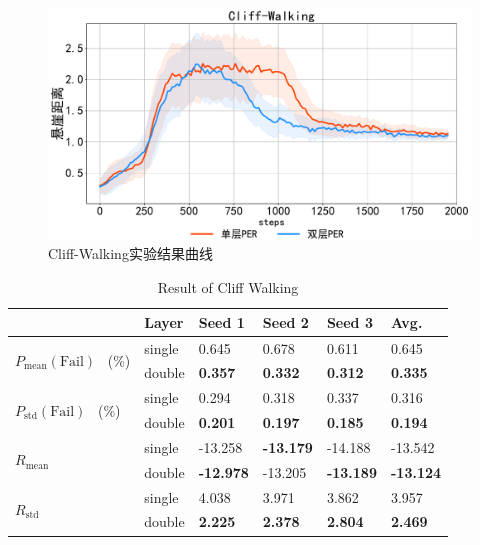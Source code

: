 \begin{figure}[t]
\centering
\includegraphics[width=\textwidth]{figures/cliffwalking.pdf}
\caption{Cliff-Walking实验结果曲线}
\label{fig:cliff-dis}
\end{figure}

\begin{table}[ht]
\centering
\begin{tabular}{l|l|l|l|l|l} 
\toprule
                                                    & Layer  & Seed 1           & Seed 2           & Seed 3           & Avg.              \\ 
\hline
\multirow{2}{*}{$P_\text{mean}(\text{Fail})$~ (\%)} & single & 0.645            & 0.678            & 0.611            & 0.645             \\ 
\cline{2-6}
                                                    & double & \textbf{0.357}   & \textbf{0.332}   & \textbf{0.312}   & \textbf{0.335}    \\ 
\hline
\multirow{2}{*}{$P_\text{std}(\text{Fail})$~ (\%)}  & single & 0.294            & 0.318            & 0.337            & 0.316             \\ 
\cline{2-6}
                                                    & double & \textbf{0.201}   & \textbf{0.197}   & \textbf{0.185}   & \textbf{0.194}    \\ 
\hline
\multirow{2}{*}{$R_\text{mean}$}                    & single & -13.258          & \textbf{-13.179} & -14.188          & -13.542           \\ 
\cline{2-6}
                                                    & double & \textbf{-12.978} & -13.205          & \textbf{-13.189} & \textbf{-13.124}  \\ 
\hline
\multirow{2}{*}{$R_\text{std}$}                     & single & 4.038            & 3.971            & 3.862            & 3.957             \\ 
\cline{2-6}
                                                    & double & \textbf{2.225}   & \textbf{2.378}   & \textbf{2.804}   & \textbf{2.469}    \\
\bottomrule
\end{tabular}
\caption{Result of Cliff Walking}
\label{tab:cliff-stats}
\end{table}

